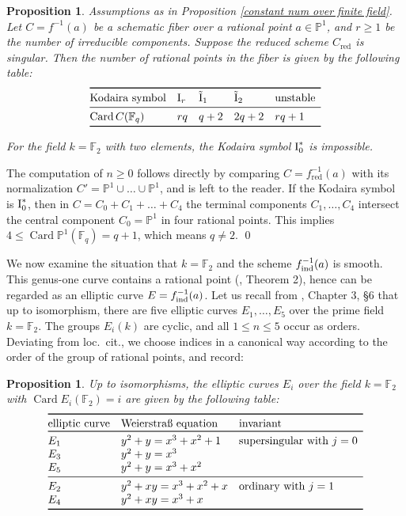 \documentclass[oneside, 12pt]{amsart}
\newcommand\mylabel[1]{\label{#1}\marginpar{\vspace{-1ex}\medskip\medskip\footnotesize \tt #1}}
\renewcommand\mylabel[1]{\label{#1}}
\newtheorem{proposition}[theorem]{Proposition}
\theoremstyle{definition}
\theoremstyle{remark}
\newcommand{\FF}{\mathbb{F}}
\newcommand{\PP}{\mathbb{P}}
\newcommand{\Card}{\operatorname{Card}}
\newcommand{\I}{\text{\rm I}}
\newcommand{\tI}{\text{\rm \~{I}}}
\newcommand{\red}{{\operatorname{red}}}
\newcommand{\ind}{\text{\rm ind}}
\newcommand{\inv}{{-1}}
\begin{document}
\begin{proposition}
\mylabel{canonical type rational points}
Assumptions as in Proposition \ref{constant num over finite field}.
Let $C=f^\inv(a)$ be a sche\-matic  fiber over a rational point $a\in\PP^1$, and $r\geq 1$ be the number
of irreducible components. Suppose the reduced scheme $C_\red$ is singular. Then the number  of rational points in the fiber 
is  given by the following table:
$$
\begin{array}[b]{@{}lllll}
\toprule
\text{\rm Kodaira symbol}	& \I_r	& \tI_1	&\tI_2	& \text{\rm unstable}\\
\midrule
\Card C(\FF_q)				& rq	& q+2 	& 2q+2	& rq+1 \\
\bottomrule
\end{array}
$$
For the field $k=\FF_2$ with two elements, the  Kodaira symbol $\I_0^*$ is impossible.
\end{proposition}

\proof
The computation of $n\geq 0$ follows directly by comparing $C=f^\inv_\red(a)$ with its normalization $C'=\PP^1\cup\ldots\cup\PP^1$, 
and is left to the  reader. If the Kodaira symbol is $\I_0^*$, then in $C=C_0+C_1+\ldots+C_4$
the terminal components $C_1,\ldots,C_4$ intersect the central component $C_0=\PP^1$ in four rational points.
This implies $4\leq \Card\PP^1(\FF_q)=q+1$, which means $q\neq 2$.
\qed

\medskip
We now   examine the situation that $k=\FF_2$  and  the scheme $ f^\inv_\ind(a)$ is smooth. 
This genus-one curve contains a rational point (\cite{Lang 1956}, Theorem 2), hence
can be regarded as an elliptic curve $E=f^\inv_\ind(a)$. 
Let us recall from \cite{Husemoller 1987}, Chapter 3, \S6 
that up to isomorphism, there are five elliptic curves $E_1,\ldots,E_5$ over the prime field $k=\FF_2$.
The groups $E_i(k)$ are cyclic, and all   $1\leq n\leq 5$ occur as orders. Deviating from loc.\ cit., we
choose indices in a canonical way according to the order of the group of rational points, and record:

\begin{proposition}
\mylabel{elliptic curves}
Up to isomorphisms, the elliptic curves $E_i$ over the field $k=\FF_2$ with $\Card E_i(\FF_2)=i$
are given by the following table:
$$
\begin{array}[b]{@{}lll}
\toprule
\text{elliptic curve}	& \text{Weierstra\ss{} equation}	& \text{invariant}\\
\toprule
E_1			& y^2+y=x^3+x^2+1 			& \text{supersingular with $j=0$}\\
E_3			& y^2+y=x^3\\
E_5			& y^2+y=x^3+x^2\\
\midrule
E_2			& y^2+xy=x^3+x^2+x  			& \text{ordinary with $j=1$}\\
E_4			& y^2+xy=x^3+x\\
\bottomrule
\end{array}
$$
\end{proposition}
 
\end{document}
